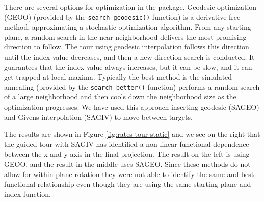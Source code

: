 \documentclass{article}
\begin{document}
There are several options for optimization in the 
package. Geodesic optimization (GEOO) (provided by the
\texttt{search\_geodesic()} function) is a derivative-free method,
approximating a stochastic optimization algorithm. From any starting
plane, a random search in the near neighborhood delivers the most
promising direction to follow. The tour using geodesic interpolation
follows this direction until the index value decreases, and then a new
direction search is conducted. It guarantees that the index value always
increases, but it can be slow, and it can get trapped at local maxima.
Typically the best method is the simulated annealing (provided by the
\texttt{search\_better()} function) performs a random search of a large
neighborhood and then cools down the neighborhood size as the
optimization progresses. We have used this approach inserting geodesic
(SAGEO) and Givens interpolation (SAGIV) to move between targets.

The results are shown in Figure \ref{fig:rates-tour-static} and we see
on the right that the guided tour with SAGIV has identified a non-linear
functional dependence between the x and y axis in the final projection.
The result on the left is using GEOO, and the result in the middle uses
SAGEO. Since these methods do not allow for within-plane rotation they
were not able to identify the same and best functional relationship even
though they are using the same starting plane and index function.
\end{document}
